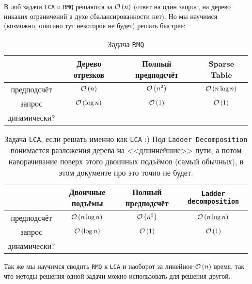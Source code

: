 \begin{note}
В лоб задачи \texttt{LCA} и \texttt{RMQ} решаются за $\mathcal{O}\left(n\right)$ (ответ на один запрос, на дерево никаких ограничений в духе сбалансированности нет). Но мы научимся (возможно, описано тут некоторое не будет) решать быстрее:
\begin{table}[ht!]
\centering
\begin{tabular}{|c|c|c|c|}
\hline
            & Дерево отрезков & Полный предподсчёт & Sparse Table \\
\hline
предподсчёт & $\mathcal{O}\left(n\right)$        & $\mathcal{O}\left(n^2\right)$         & $\mathcal{O}\left(n\log{n}\right)$ \\
\hline
запрос      & $\mathcal{O}\left(\log{n}\right)$  & $\mathcal{O}\left(1\right)$ & $\mathcal{O}\left(1\right)$ \\
\hline
динамически?  & \color{OliveGreen}{да} & \color{red}{нет} & \color{red}{нет} \\
\hline
\end{tabular}
\caption{Задача \texttt{RMQ}}
\end{table}

\begin{table}[ht!]
\centering
\begin{tabular}{|c|c|c|c|}
\hline
            & Двоичные подъёмы & Полный предподсчёт & \texttt{Ladder decomposition} \\
\hline
предподсчёт & $\mathcal{O}\left(n\log{n}\right)$        & $\mathcal{O}\left(n^2\right)$ &  $\mathcal{O}\left(n\log{n}\right)$ \\
\hline
запрос      & $\mathcal{O}\left(\log{n}\right)$  & $\mathcal{O}\left(1\right)$ & $\mathcal{O}\left(1\right)$\\
\hline
динамически?  & \color{red}{нет} & \color{red}{нет} & \color{red}{нет}\\
\hline
\end{tabular}
\caption{Задача \texttt{LCA}, если решать именно как \texttt{LCA} :) Под \texttt{Ladder Decomposition} понимается разложения дерева на <<длиннейшие>> пути, а потом наворачивание поверх этого двоичных подъёмов (самый обычных), в этом документе про это точно не будет. }
\end{table}
Так же мы научимся сводить \texttt{RMQ} к \texttt{LCA} и наоборот за линейное $\mathcal{O}\left(n\right)$ время, так что методы решения одной задачи можно использовать для решения другой.
\end{note}

